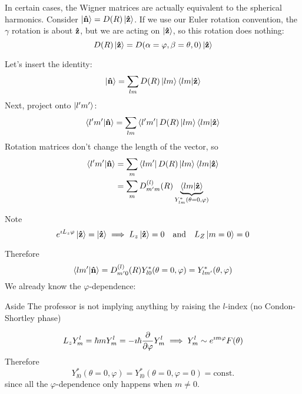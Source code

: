 \documentclass[a4paper,twoside,master.tex]{subfiles}
\begin{document}
In certain cases, the Wigner matrices are actually equivalent to the spherical harmonics. Consider $\ket{\vu{n}} = D(R)\ket{\vu{z}} $. If we use our Euler rotation convention, the $ \gamma $ rotation is about $ \vu{z} $, but we are acting on $\ket{\vu{z}} $, so this rotation does nothing:
\begin{equation}
    D(R)\ket{\vu{z}} = D(\alpha = \varphi, \beta = \theta, 0)\ket{\vu{z}}
\end{equation}

Let's insert the identity:
\begin{equation}
    \ket{\vu{n}} = \sum_{lm} D(R)\ket{lm}\bra{lm}\ket{\vu{z}}
\end{equation}
Next, project onto $\ket{l'm'} $:
\begin{equation}
    \bra{l'm'}\ket{\vu{n}} = \sum_{lm}\bra{l'm'} D(R)\ket{lm}\bra{lm}\ket{\vu{z}}
\end{equation}
Rotation matrices don't change the length of the vector, so
\begin{align}
    \bra{l'm'}\ket{\vu{n}} &= \sum_{m}\bra{lm'} D(R)\ket{lm}\bra{lm}\ket{\vu{z}} \\
    &= \sum_m D^{(l)}_{m'm}(R)\underbrace{\bra{lm}\ket{\vu{z}}}_{Y^*_{lm}(\theta = 0, \varphi)}
\end{align}
\begin{note}{Note}
    \begin{equation}
        e^{\imath L_z \varphi}\ket{\vu{z}} =\ket{\vu{z}} \implies L_z\ket{\vu{z}} = 0 \qand L_Z\ket{m=0} = 0
    \end{equation}
\end{note}
Therefore
\begin{equation}
    \bra{lm'}\ket{\vu{n}} = D^{(l)}_{m'0}(R) Y^*_{l0}(\theta = 0, \varphi) = Y^*_{lm'}(\theta, \varphi)
\end{equation}
We already know the $ \varphi $-dependence:
\begin{note}{Aside}
    The professor is not implying anything by raising the $ l $-index (no Condon-Shortley phase)
\end{note}
\begin{equation}
    L_z Y^l_{m} = \hbar m Y^l_{m} = - \imath \hbar \pdv{\varphi} Y^l_m \implies Y^l_m \sim e^{\imath m \varphi} F(\theta) 
\end{equation}
Therefore
\begin{equation}
    Y^*_{l0}(\theta = 0, \varphi) = Y^*_{l0}(\theta = 0, \varphi = 0) = \text{const.} 
\end{equation}
since all the $\varphi$-dependence only happens when $ m \neq 0 $.
\end{document}
